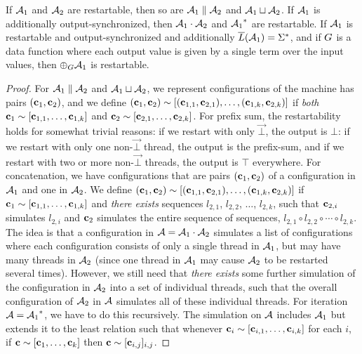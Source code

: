 \begin{theorem}
\label{dt:thm:restartability-preserved}
If $\mathcal{A}_1$ and $\mathcal{A}_2$ are restartable, then so
are $\mathcal{A}_1 \; \| \; \mathcal{A}_2$ and $\mathcal{A}_1 \sqcup \mathcal{A}_2$.
If $\mathcal{A}_1$ is additionally output-synchronized, then $\mathcal{A}_1 \cdot \mathcal{A}_2$ and ${{\mathcal{A}_1}^{*}}$ are restartable.
If $\mathcal{A}_1$ is restartable and output-synchronized and additionally $\overline{L}(\mathcal{A}_1) = \Sigma^{*}$, and if $G$ is a data function where each output value is given by a single term over the input values, then $\prefixsum{\DT_1}{\DF}$ is restartable.
\end{theorem}
\begin{proof}
For $\mathcal{A}_1 \; \| \; \mathcal{A}_2$ and $\mathcal{A}_1 \sqcup \mathcal{A}_2$, we represent configurations of the machine has pairs $(\mathbf{c}_1, \mathbf{c}_2)$, and we define $(\mathbf{c}_1, \mathbf{c}_2) \sim [(\mathbf{c}_{1,1},\mathbf{c}_{2,1}),\ldots,(\mathbf{c}_{1,k},\mathbf{c}_{2,k})]$ if \emph{both} $\mathbf{c}_1 \sim [\mathbf{c}_{1,1},\ldots,\mathbf{c}_{1,k}]$ and $\mathbf{c}_2 \sim [\mathbf{c}_{2,1},\ldots,\mathbf{c}_{2,k}]$.
For prefix sum, the restartability holds for somewhat trivial reasons: if we restart with only $\vec{\bot}$, the output is $\bot$: if we restart with only one non-$\vec{\bot}$ thread, the output is the prefix-sum, and if we restart with two or more non-$\vec{\bot}$ threads, the output is $\top$ everywhere.
For concatenation, we have configurations that are pairs $(\mathbf{c}_1, \mathbf{c}_2)$ of a configuration in $\mathcal{A}_1$ and one in $\mathcal{A}_2$. We define $(\mathbf{c}_1, \mathbf{c}_2) \sim [(\mathbf{c}_{1,1},\mathbf{c}_{2,1}),\ldots,(\mathbf{c}_{1,k},\mathbf{c}_{2,k})]$ if $\mathbf{c}_1 \sim [\mathbf{c}_{1,1},\ldots,\mathbf{c}_{1,k}]$ and \emph{there exists} sequences $l_{2,1}$, $l_{2,2}$, $\ldots$, $l_{2,k}$, such that $\mathbf{c}_{2,i}$ simulates $l_{2,i}$ and $\mathbf{c}_2$ simulates the entire sequence of sequences, $l_{2,1} \circ l_{2,2} \circ \cdots \circ l_{2,k}$. The idea is that a configuration in $\mathcal{A} = \mathcal{A}_1 \cdot \mathcal{A}_2$ simulates a list of configurations where each configuration consists of only a single thread in $\mathcal{A}_1$, but may have many threads in $\mathcal{A}_2$ (since one thread in $\mathcal{A}_1$ may cause $\mathcal{A}_2$ to be restarted several times). However, we still need that \emph{there exists} some further simulation of the configuration in $\mathcal{A}_2$ into a set of individual threads, such that the overall configuration of $\mathcal{A}_2$ in $\mathcal{A}$ simulates all of these individual threads.
For iteration $\mathcal{A} = {{\mathcal{A}_1}^{*}}$, we have to do this recursively. The simulation on $\mathcal{A}$ includes $\mathcal{A}_1$ but extends it to the least relation such that whenever $\mathbf{c}_i \sim [\mathbf{c}_{i,1}, \ldots, \mathbf{c}_{i,k}]$ for each $i$, if $\mathbf{c} \sim [\mathbf{c}_1, \ldots, \mathbf{c}_k]$ then $\mathbf{c} \sim [\mathbf{c}_{i,j}]_{i,j}$.
\end{proof}

